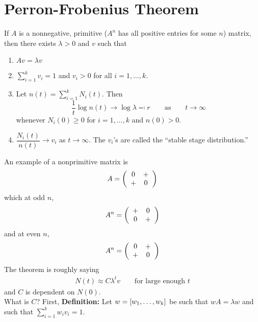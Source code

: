 \documentclass{article}
\begin{document}
    \section{Perron-Frobenius Theorem}
        If $A$ is a nonnegative, primitive ($A^n$ has all positive entries for some $n$) matrix, then there exists $\lambda > 0$ and $v$ such that
        \begin{enumerate}
            \item $Av = \lambda v$
            \item $\sum_{i=1}^k v_i = 1$ and $v_i > 0$ for all $i = 1, \dots, k$.
            \item Let $n(t) = \sum_{i=1}^k N_i(t)$.  Then $$\frac{1}{t}\log n(t) \rightarrow \log \lambda \eqqcolon r \qquad \text{as} \qquad t \rightarrow \infty$$ whenever $N_i(0) \geq 0$ for $i = 1, \dots, k$ and $n(0) > 0$.
            \item $\dfrac{N_i(t)}{n(t)} \rightarrow v_i$ as $t \rightarrow \infty$.  The $v_i$'s are called the ``stable stage distribution.''
        \end{enumerate}
        An example of a nonprimitive matrix is
        \begin{align}
            A = \qty(\begin{array}{cc} 0 & + \\ + & 0 \end{array})
        \end{align}
        which at odd $n$,
        \begin{align}
            A^n = \qty(\begin{array}{cc}+ & 0 \\ 0 & +\end{array})
        \end{align}
        and at even $n$,
        \begin{align}
            A^n = \qty(\begin{array}{cc} 0 & + \\ + & 0 \end{array})
        \end{align}
        The theorem is roughly saying
        \begin{align}
            N(t) \approx C \lambda^t v \qquad \text{for large enough $t$}
        \end{align}
        and $C$ is dependent on $N(0)$.\\

        What is $C$?  First, \textbf{Definition:} Let $w = \qty[w_1, \dots, w_k]$ be such that $wA = \lambda w$ and such that $\sum_{i=1}^kw_iv_i = 1$.
\end{document}
